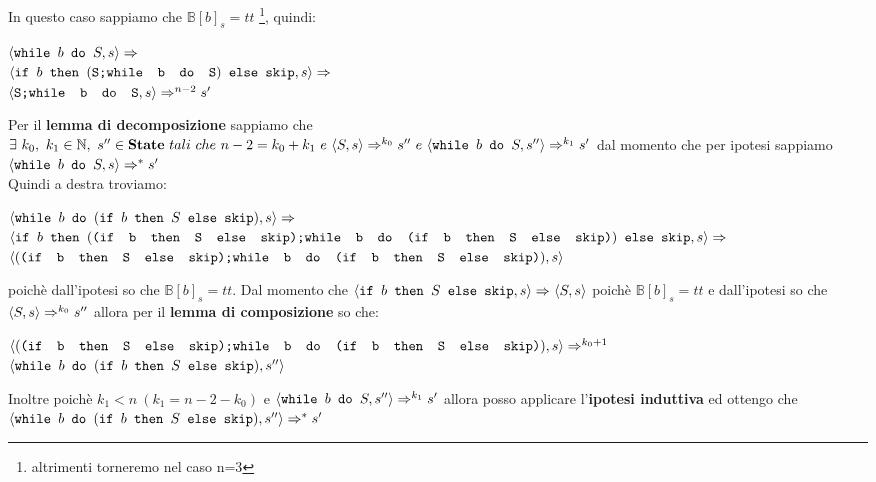 {	 In questo caso sappiamo che $\mathbb{B}[b]_s=tt$
	\footnote{altrimenti torneremo nel caso n=3}, quindi:
	\begin{center}
	$\confSs{\wbS{b}{S}}{s}\Rar{}$\\
	$\confSs{
		\ifABC{b}
			{(\concat{S}{\wbS{b}{S}})}
			{\skipistr}
	}{s}\Rar{}$\\
	$\confSs{\concat{S}{\wbS{b}{S}}}{s}\Rar{n-2}s'$
	\end{center}
	Per il \textbf{lemma di decomposizione} sappiamo che 
	$\exists{}~k_0,~k_1\in\mathbb{N},~s''\in\states~tali~che~n-2=k_0+k_1~e~
	\confSs{S}{s}\Rar{k_0}s''~e~\confSs{\wbS{b}{S}}{s''}\Rar{k_1}s'$ dal
	momento che per ipotesi sappiamo $\confSs{\wbS{b}{S}}{s}\Rar{*}s'$\\
	Quindi a destra troviamo:
	\begin{center}
	$\confSs{\wbS{b}{(\ifABC{b}{S}{\skipistr})}}{s}\Rar{}$\\
	$\confSs{
		\ifABC{b}
		{(\concat{(\ifABC{b}{S}{\skipistr})}
		{\wbS{b}{(\ifABC{b}{S}{\skipistr})}})}
		{\skipistr}}{s}\Rar{}$\\
	$\confSs{
		{(\concat{(\ifABC{b}{S}{\skipistr})}
		{\wbS{b}{(\ifABC{b}{S}{\skipistr})}})}
	}{s}$
	\end{center}
	poichè dall'ipotesi so che $\mathbb{B}[b]_s=tt$. Dal momento che 
	$\confSs{\ifABC{b}{S}{\skipistr}}{s}\Rar{}\confSs{S}{s}$ poichè
	$\mathbb{B}[b]_s=tt$ e dall'ipotesi so che $\confSs{S}{s}\Rar{k_0}s''$
	allora per il \textbf{lemma di composizione} so che:
	\begin{center}
	$\confSs{
		{(\concat{(\ifABC{b}{S}{\skipistr})}
		{\wbS{b}{(\ifABC{b}{S}{\skipistr})}})}
	}{s}\Rar{k_0+1}$\\
	$\confSs{\wbS{b}{(\ifABC{b}{S}{\skipistr})}}{s''}$
	\end{center}
	Inoltre poichè $k_1<n~(k_1=n-2-k_0)$ e $\confSs{\wbS{b}{S}}{s''}\Rar{k_1}s'$
	allora posso applicare l'\textbf{ipotesi induttiva} ed ottengo che
	$\confSs{\wbS{b}{(\ifABC{b}{S}{\skipistr})}}{s''}\Rar{*}s'$

}
